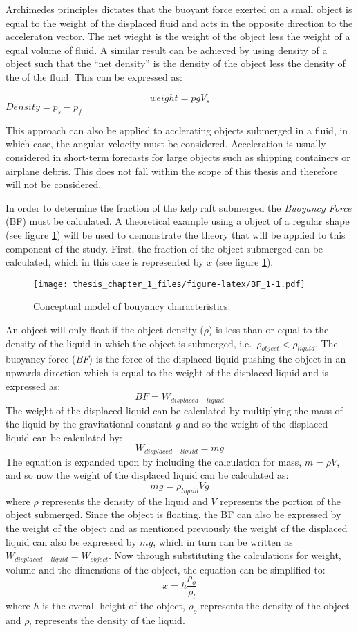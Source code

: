 \documentclass[
]{article}
\begin{document}
Archimedes principles dictates that the buoyant force exerted on a small
object is equal to the weight of the displaced fluid and acts in the
opposite direction to the acceleraton vector. The net wieght is the
weight of the object less the weight of a equal volume of fluid. A
similar result can be achieved by using density of a object such that
the ``net density'' is the density of the object less the density of the
of the fluid. This can be expressed as:

\[weight=pgV_s\] \(Density=p_s-p_f\)

This approach can also be applied to acclerating objects submerged in a
fluid, in which case, the angular velocity must be considered.
Acceleration is usually considered in short-term forecasts for large
objects such as shipping containers or airplane debris. This does not
fall within the scope of this thesis and therefore will not be
considered.

In order to determine the fraction of the kelp raft submerged the
\emph{Buoyancy Force} (BF) must be calculated. A theoretical example
using a object of a regular shape (see figure \ref{fig:BF_1}) will be
used to demonstrate the theory that will be applied to this component of
the study. First, the fraction of the object submerged can be
calculated, which in this case is represented by \(x\) (see figure
\ref{fig:BF_1}).

\begin{figure}
\centering
\texttt{[image: thesis\_chapter\_1\_files/figure-latex/BF\_1-1.pdf]}
\caption{\label{fig:BF_1}Conceptual model of bouyancy characteristics.}
\end{figure}

An object will only float if the object density (\(\rho\)) is less than
or equal to the density of the liquid in which the object is submerged,
i.e.~\(\rho_{object} < \rho_{liquid}\). The buoyancy force (\emph{BF})
is the force of the displaced liquid pushing the object in an upwards
direction which is equal to the weight of the displaced liquid and is
expressed as: \[BF = W_{displaced-liquid}\] The weight of the displaced
liquid can be calculated by multiplying the mass of the liquid by the
gravitational constant \(g\) and so the weight of the displaced liquid
can be calculated by: \[W_{displaced-liquid} = mg\] The equation is
expanded upon by including the calculation for mass, \(m = \rho V\), and
so now the weight of the displaced liquid can be calculated as:
\[mg = \rho_{liquid} V g\] where \(\rho\) represents the density of the
liquid and \(V\) represents the portion of the object submerged. Since
the object is floating, the BF can also be expressed by the weight of
the object and as mentioned previously the weight of the displaced
liquid can also be expressed by \(mg\), which in turn can be written as
\(W_{displaced-liquid} = W_{object}\). Now through substituting the
calculations for weight, volume and the dimensions of the object, the
equation can be simplified to:
\[x= h\displaystyle\frac{\rho_o}{\rho_l}\] where \(h\) is the overall
height of the object, \(\rho_o\) represents the density of the object
and \(\rho_l\) represents the density of the liquid.
\end{document}
